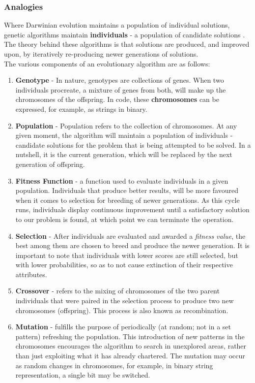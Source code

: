 \documentclass[conference,compsoc]{IEEEtran}
\begin{document}
\subsubsection{Analogies}
Where Darwinian evolution maintains a population of individual solutions, genetic algorithms maintain 
\textbf{individuals} - a population of candidate solutions \cite{Wiransky-GA}. The theory behind these 
algorithms is that solutions are produced, and improved upon, by iteratively re-producing newer generations of solutions.
\\
The various components of an evolutionary algorithm are as follows:
\begin{enumerate}
    \item \textbf{Genotype} - In nature, genotypes are collections of genes. When two individuals procreate, a mixture of genes 
    from both, will make up the chromosomes of the offspring. In code, these \textbf{chromosomes} 
    can be expressed, for example, as strings in binary. 
    \item \textbf{Population} - Population refers to the collection of chromosomes. At any given moment, the 
    algorithm will maintain a population of individuals - candidate solutions for the problem that is being attempted 
    to be solved. In a nutshell, it is the current generation, which will be replaced by the next generation of offspring. 
    \item \textbf{Fitness Function} - a function used to evaluate individuals in a given population. Individuals 
    that produce better results, will be more favoured when it comes to selection for breeding of newer generations. As this cycle runs, individuals display continuous improvement until a satisfactory solution to our problem is found, at which point we can terminate the operation.
    \item \textbf{Selection} - After individuals are evaluated and awarded a \textit{fitness value}, 
    the best among them are chosen to breed and produce the newer generation. It is important to note 
    that individuals with lower scores are still selected, but with lower probabilities, so as to not 
    cause extinction of their respective attributes.
    \item \textbf{Crossover} - refers to the mixing of chromosomes of the two parent individuals 
    that were paired in the selection process to produce two new chromosomes (offspring). This process is also known as recombination.
    \item \textbf{Mutation} - fulfills the purpose of periodically (at random; not in a set pattern) refreshing 
    the population. This introduction of new patterns in the chromosomes encourages the algorithm to search in unexplored areas, rather than just exploiting what it has already chartered. The mutation may occur as random changes in chromosomes, for example, in binary string representation, a single bit may be switched.
\end{enumerate}
\end{document}
